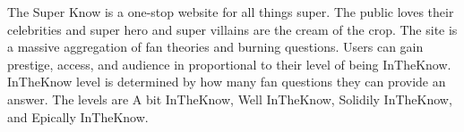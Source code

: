 \documentclass[green]{LRSguildcamp1}
\begin{document}
\name{\gTest{}}

The Super Know is a one-stop website for all things super. The public loves their celebrities and super hero and super villains are the cream of the crop. The site is a massive aggregation of fan theories and burning questions. Users can gain prestige, access, and audience in proportional to their level of being InTheKnow. InTheKnow level is determined by how many fan questions they can provide an answer. The levels are A bit InTheKnow, Well InTheKnow, Solidily InTheKnow, and
Epically InTheKnow.
\end{document}
